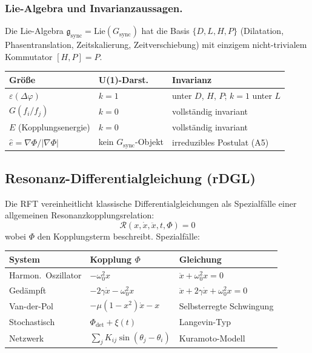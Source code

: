 \documentclass[12pt]{iopart}
\begin{document}
	\subsubsection{Lie-Algebra und Invarianzaussagen.}
	
	Die Lie-Algebra $\mathfrak{g}_{\mathrm{sync}} =
	\mathrm{Lie}(G_{\mathrm{sync}})$ hat die Basis
	$\{D, L, H, P\}$ (Dilatation, Phasentranslation,
	Zeitskalierung, Zeitverschiebung) mit einzigem
	nicht-trivialem Kommutator $[H, P] = P$.
	
	\begin{center}
		\small
		\begin{tabular}{lll}
			\hline
			\textbf{Gr\"o\ss{}e} & \textbf{U(1)-Darst.}
			& \textbf{Invarianz} \\
			\hline
			$\varepsilon(\Delta\varphi)$ & $k = 1$
			& unter $D$, $H$, $P$; $k{=}1$ unter $L$ \\
			$G(f_i/f_j)$ & $k = 0$
			& vollst\"andig invariant \\
			$E$ (Kopplungsenergie) & $k = 0$
			& vollst\"andig invariant \\
			$\hat{e} = \nabla\Phi/|\nabla\Phi|$ & kein $G_{\mathrm{sync}}$-Objekt
			& irreduzibles Postulat (A5) \\
			\hline
		\end{tabular}
	\end{center}
	
	\subsection{Resonanz-Differentialgleichung (rDGL)}
	
	Die RFT vereinheitlicht klassische Differentialgleichungen
	als Spezialf\"alle einer allgemeinen
	Resonanzkopplungsrelation:
	\begin{equation}
		\mathcal{R}(x, \dot{x}, \ddot{x}, t, \Phi) = 0
		\label{eq:rdgl}
	\end{equation}
	wobei $\Phi$ den Kopplungsterm beschreibt. Spezialf\"alle:
	
	\medskip
	\begin{center}
		\begin{tabular}{lll}
			\hline
			\textbf{System} & \textbf{Kopplung $\Phi$}
			& \textbf{Gleichung} \\
			\hline
			Harmon.\ Oszillator & $-\omega_0^2 x$
			& $\ddot{x} + \omega_0^2 x = 0$ \\
			Ged\"ampft & $-2\gamma\dot{x} - \omega_0^2 x$
			& $\ddot{x} + 2\gamma\dot{x} + \omega_0^2 x = 0$ \\
			Van-der-Pol & $-\mu(1{-}x^2)\dot{x} - x$
			& Selbsterregte Schwingung \\
			Stochastisch & $\Phi_{\det} + \xi(t)$
			& Langevin-Typ \\
			Netzwerk & $\sum_j K_{ij}\sin(\theta_j{-}\theta_i)$
			& Kuramoto-Modell \\
			\hline
		\end{tabular}
	\end{center}
	
\end{document}

